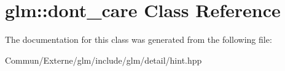 \hypertarget{classglm_1_1dont__care}{}\section{glm\+:\+:dont\+\_\+care Class Reference}
\label{classglm_1_1dont__care}


The documentation for this class was generated from the following file\+:\begin{DoxyCompactItemize}
\item 
Commun/\+Externe/glm/include/glm/detail/hint.\+hpp\end{DoxyCompactItemize}
